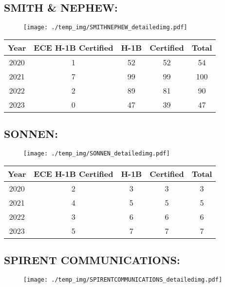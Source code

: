 \documentclass{article}%
\begin{document}
%
\newpage%
\subsection{SMITH \& NEPHEW:}%
\label{subsec:SMITHNEPHEW}%
\label{SMITHNEPHEWdetailed}%


\begin{figure}[htbp]%
\centering%
\texttt{[image: ./temp\_img/SMITHNEPHEW\_detailedimg.pdf]}%
\end{figure}

%
\begin{longtable}{c|c|c|c|c}%
\hline%
Year&ECE H{-}1B Certified&H{-}1B&Certified&Total\\%
\hline%
2020&1&52&52&54\\%
\hline%
2021&7&99&99&100\\%
\hline%
2022&2&89&81&90\\%
\hline%
2023&0&47&39&47\\%
\hline%
\end{longtable}

%
\newpage%
\subsection{SONNEN:}%
\label{subsec:SONNEN}%
\label{SONNENdetailed}%


\begin{figure}[htbp]%
\centering%
\texttt{[image: ./temp\_img/SONNEN\_detailedimg.pdf]}%
\end{figure}

%
\begin{longtable}{c|c|c|c|c}%
\hline%
Year&ECE H{-}1B Certified&H{-}1B&Certified&Total\\%
\hline%
2020&2&3&3&3\\%
\hline%
2021&4&5&5&5\\%
\hline%
2022&3&6&6&6\\%
\hline%
2023&5&7&7&7\\%
\hline%
\end{longtable}

%
\newpage%
\subsection{SPIRENT COMMUNICATIONS:}%
\label{subsec:SPIRENTCOMMUNICATIONS}%
\label{SPIRENTCOMMUNICATIONSdetailed}%


\begin{figure}[htbp]%
\centering%
\texttt{[image: ./temp\_img/SPIRENTCOMMUNICATIONS\_detailedimg.pdf]}%
\end{figure}
\end{document}
